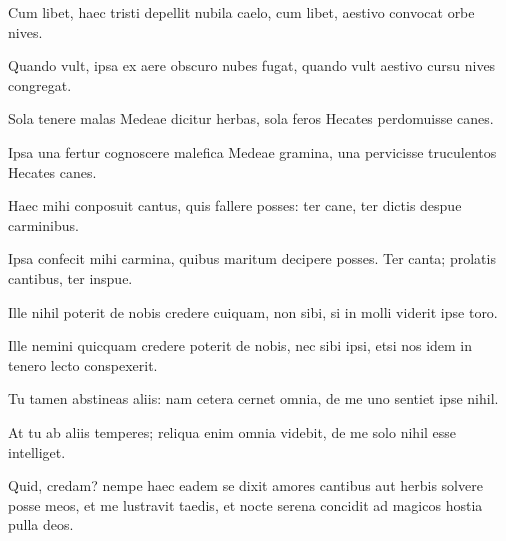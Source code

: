{\large

\noindent Cum libet, haec tristi depellit nubila caelo, cum libet, aestivo convocat orbe nives.\\

}


\noindent Quando vult, ipsa ex aere obscuro nubes fugat, quando vult aestivo cursu nives congregat. \\

{\large

\noindent Sola tenere malas Medeae dicitur herbas, sola feros Hecates perdomuisse canes.\\

}


\noindent Ipsa una fertur cognoscere malefica Medeae gramina, una pervicisse truculentos Hecates canes. \\

{\large

\noindent Haec mihi conposuit cantus, quis fallere posses: ter cane, ter dictis despue carminibus.\\

}


\noindent Ipsa confecit mihi carmina, quibus maritum decipere posses. Ter canta; prolatis cantibus, ter inspue. \\

{\large

\noindent Ille nihil poterit de nobis credere cuiquam, non sibi, si in molli viderit ipse toro.\\

}


\noindent Ille nemini quicquam credere poterit de nobis, nec sibi ipsi, etsi nos idem in tenero lecto conspexerit.\\

\newpage

{\large

\noindent Tu tamen abstineas aliis: nam cetera cernet omnia, de me uno sentiet ipse nihil.\\

}


\noindent At tu ab aliis temperes; reliqua enim omnia videbit, de me solo nihil esse intelliget. \\

{\large

\noindent Quid, credam? nempe haec eadem se dixit amores cantibus aut herbis solvere posse meos, et me lustravit taedis, et nocte serena concidit ad magicos hostia pulla deos.\\

}


